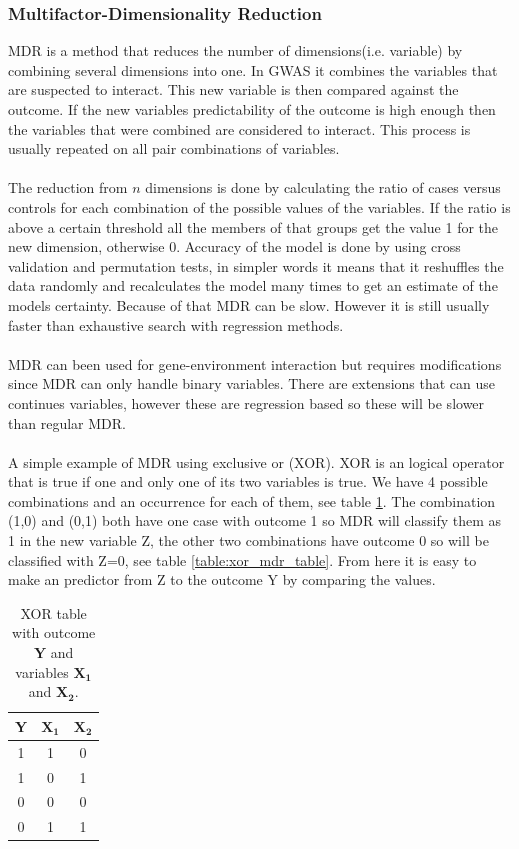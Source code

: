 \documentclass[10pt,a4paper]{report}
\newcounter{example}
\begin{document}
\subsubsection{Multifactor-Dimensionality Reduction}
MDR is a method that reduces the number of dimensions(i.e. variable) by combining several dimensions into one. In GWAS it combines the variables that are suspected to interact. This new variable is then compared against the outcome. If the new variables predictability of the outcome is high enough then the variables that were combined are considered to interact. This process is usually repeated on all pair combinations of variables.\\
\\
The reduction from $n$ dimensions is done by calculating the ratio of cases versus controls for each combination of the possible values of the variables. If the ratio is above a certain threshold all the members of that groups get the value 1 for the new dimension, otherwise 0. Accuracy of the model is done by using cross validation and permutation tests, in simpler words it means that it reshuffles the data randomly and recalculates the model many times to get an estimate of the models certainty. Because of that MDR can be slow. However it is still usually faster than exhaustive search with regression methods.\cite{cordell_detect_review,mdr_2001}\\
\\
MDR can been used for gene-environment interaction but requires modifications since MDR can only handle binary variables. There are extensions that can use continues variables, however these are regression based so these will be slower than regular MDR.\cite{gene_enviroment_2013}\\
\\
A simple example of MDR using exclusive or (XOR). XOR is an logical operator that is true if one and only one of its two variables is true. We have 4 possible combinations and an occurrence for each of them, see table \ref{table:xor_table}. The combination (1,0) and (0,1) both have one case with outcome 1 so MDR will classify them as 1 in the new variable Z, the other two combinations have outcome 0 so will be classified with Z=0, see table \ref{table:xor_mdr_table}. From here it is easy to make an predictor from Z to the outcome Y by comparing the values.

\begin{table}[h]
\begin{tabular}{ | c | c | c | }
  \hline
  \textbf{Y} & $\mathbf{X_1}$ & $\mathbf{X_2}$ \\
  \hline
  1 & 1 & 0 \\
  \hline 
  1 & 0 & 1 \\
  \hline
  0 & 0 & 0 \\
  \hline
  0 & 1 & 1 \\
  \hline
\end{tabular}
\caption{XOR table with outcome $\mathbf{Y}$ and variables $\mathbf{X_1}$ and $\mathbf{X_2}$.}
\label{table:xor_table}
\end{table}
\end{document}
